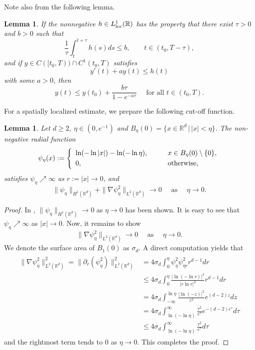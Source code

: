 \documentclass{amsart}
\newtheorem{lemma}[defn]{Lemma}
\numberwithin{equation}{section}
\newcommand{\R}{{ \mathbb{R}  }}
\begin{document}
Note also  from \cite[Lem.~3.4.]{Winkler2019} the following lemma. 
\begin{lemma}\label{EXPTINT}
If the nonnegative $h\in L^{1}_{\rm loc}(\mathbb{R})$ has the property that there exist $\tau>0$ and $b>0$ such that
\[
\frac{1}{\tau}\int_{t}^{t+\tau}h(s)ds\le b,\qquad t\in (t_0,T-\tau),
\]
and if
$y\in C([t_0,T))\cap C^{1}(t_0,T)$ satisfies 
\[
y'(t)+ay(t)\le h(t)
\]
 with some $a>0$, then
\[
y(t)\le y(t_{0})+\frac{b\tau}{1-e^{-a\tau}}\quad\mbox{ for all }t\in(t_{0},T).
\]
\end{lemma}


For a spatially localized estimate, we prepare the following cut-off function.
\begin{lemma}\label{PSILEM}
Let $d\ge2$,  $\eta\in(0,e^{-1})$ and  $B_{\eta}(0)=\{ x\in\mathbb{R}^{d}\,|\, |x|<\eta\}$.
The non-negative radial   function 
\[
\psi_{\eta}(x):=
\left\{  
\begin{array}{ll}
\ln(-\ln |x| )-\ln(-\ln\eta),\qquad &x\in B_{\eta}(0)\setminus\{0\},\vspace{1mm}
\\
0,  &{\rm otherwise},
\end{array}
\right.
\]
satisfies $\psi_{\eta}\nearrow \infty$  as $r:=|x|\rightarrow 0$, and 
\[
\|\psi_{\eta}\|_{H^{1}(\mathbb{R}^{d})}+\|\nabla  \psi_{\eta}^{2} \|_{L^{2}(\mathbb{R}^{d})}\rightarrow 0\quad\mbox{ as }\quad\eta\rightarrow 0. 
\]
 \end{lemma}
\begin{proof}
In \cite[Prop.~3.1.]{Ahn_Kang_Lee_2023}, $
\|\psi_{\eta}\|_{H^{1}(\mathbb{R}^{d})}\rightarrow 0$  as $\eta\rightarrow 0$ has been shown. It is easy to see that $\psi_{\eta}\nearrow \infty$  as $|x|\rightarrow 0$. 
Now, it remains to show
\[
\|\nabla \psi_{\eta}^{2}\|_{L^{2}(\mathbb{R}^{d})}\rightarrow 0\quad\mbox{ as }\quad\eta\rightarrow 0. 
\]
We denote the surface area of $B_{1}(0)$  as  $\sigma_{d}$.
A direct computation yields that   
\begin{align*}
\begin{aligned}
\|\nabla \psi_{\eta}^{2}\|_{L^{2}(\mathbb{R}^{d})}^{2}=\|\partial_{r} (\psi_{\eta}^{2})\|_{L^{2}(\mathbb{R}^{d})}^{2}
&=4\sigma_{d}\int_{0}^{\eta} \psi_{\eta}^{2} \psi_{\eta r}^{2}r^{d-1}dr
\\&\le 4\sigma_{d}\int_{0}^{\eta}\frac{|\ln(-\ln r)|^{2}}{|r\ln r|^{2}}r^{d-1}dr 
\\&=4\sigma_{d}\int_{-\infty}^{\ln\eta}\frac{|\ln(-z)|^{2}}{z^{2}}e^{(d-2)z}dz
\\&=4\sigma_{d}\int_{\ln(-\ln\eta)}^{\infty} \frac{\tau^{2}}{e^{\tau}}e^{-(d-2)e^{\tau}}d\tau
\\&\le 4\sigma_{d}\int_{\ln(-\ln\eta)}^{\infty} \frac{\tau^{2}}{e^{\tau}}d\tau
\end{aligned}
\end{align*}
and the rightmost term tends to $0$ as $\eta\rightarrow 0$. This completes the proof.
\end{proof}
\end{document}
